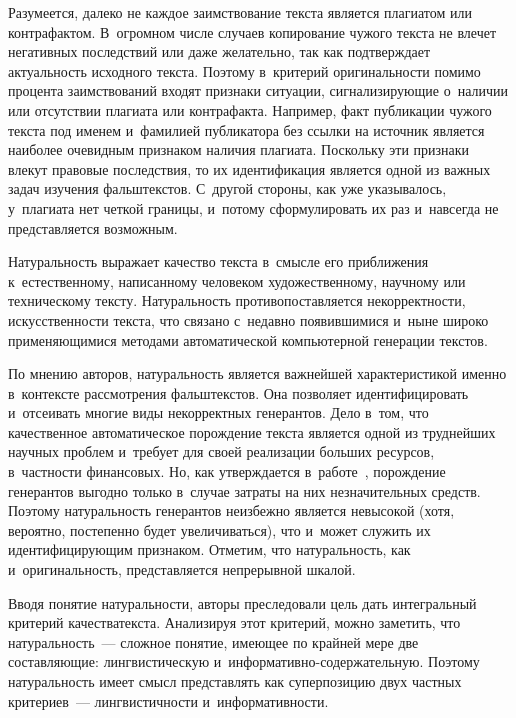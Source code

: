 \begin{multicols}{2}
   Разумеется, далеко не каждое заимствование текста является плагиатом
или контрафактом. В~огромном числе случаев копирование чужого текс\-та не
влечет негативных последствий или даже желательно, так как подтверждает
актуальность исходного текс\-та. Поэтому в~критерий оригинальности
помимо процента заимствований входят признаки ситуации,
сигнализирующие о~наличии или отсутствии плагиата или контрафакта.
Например, факт публикации чужого текста под именем и~фамилией
публикатора без ссылки на источник является наиболее очевидным
признаком наличия плагиата. Поскольку эти признаки влекут правовые
последствия, то их идентификация является одной из важных задач изучения
фальштекстов. С~другой стороны, как уже указывалось, у~плагиата нет
четкой границы, и~потому сформулировать их раз и~навсегда не
представляется возможным.

   Натуральность выражает качество текста в~смыс\-ле его приближения
к~естественному, написанному человеком художественному, научному или
техническому тексту. Натуральность про\-ти\-во\-по\-став\-ля\-ет\-ся некорректности,
искусственности текста, что связано с~недавно появившимися и~ныне
широко применяющимися методами автоматической компьютерной
генерации текстов.

   По мнению авторов, натуральность является важнейшей характеристикой
именно в~контексте рассмотрения фальштекстов. Она позволяет
идентифицировать и~отсеивать многие виды некорректных генерантов. Дело
в~том, что качественное автоматическое порождение текста является одной
из труднейших научных проблем и~требует для своей реализации больших
ресурсов, в~частности финансовых. Но, как утверждается
   в~работе~\cite{1-koz}, порождение генерантов выгодно только в~случае
затраты на них незначительных средств. Поэтому натуральность генерантов
неизбежно является невысокой (хотя, вероятно, постепенно будет
увеличиваться), что и~может служить их идентифицирующим признаком.
Отметим, что натуральность, как и~оригинальность, представляется
непрерывной шкалой.
{

}

   Вводя понятие натуральности, авторы преследовали цель дать
интегральный критерий качества\linebreak текста. Анализируя этот критерий, можно
заметить, что натуральность~--- сложное понятие, имеющее по крайней мере
две составляющие: лингвистическую
   и~ин\-фор\-ма\-тив\-но-со\-дер\-жа\-тель\-ную. \mbox{Поэтому} натуральность
имеет смысл представлять как суперпозицию двух частных критериев~---
лингвистичности и~информативности.


\end{multicols}
